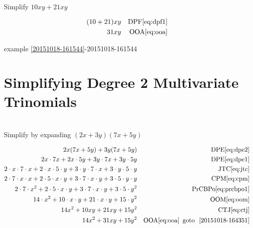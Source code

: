 \documentclass[20150903-160354-rs2.2-MarksMathNotebook.tex]{subfiles}
\begin{document}
\begin{example}[id:20151018-164351] \label{20151018-164351} \hfill \\

Simplify $10xy + 21xy$

\soln

\solnsteps
\begin{align*}
(10+21)xy && \text{DPF} \eqref{eq:dpf1} \\
31xy && \text{OOA} \eqref{eq:ooa} 
\end{align*}

\qdepend

\qdependlist
example \ref{20151018-161544}-20151018-161544

\end{example}



\section{Simplifying Degree 2 Multivariate Trinomials}\label{Simplify! Degree 2 Multivariate Trinomials}

\begin{example}[id:20151018-161544] \label{20151018-161544} \hfill \\
Simplify by expanding $(2x+3y)(7x+5y)$

\soln

\solnsteps
\begin{align*}
2x(7x+5y) + 3y(7x+5y) && \text{DPE} \eqref{eq:dpe2} \\
2x \cdot 7x + 2x \cdot 5y + 3y \cdot 7x + 3y \cdot 5y && \text{DPE} \eqref{eq:dpe1} \\
2 \cdot x \cdot 7 \cdot x +  2 \cdot x \cdot 5 \cdot y + 3 \cdot y \cdot 7 \cdot x + 3 \cdot y \cdot 5 \cdot y && \text{JTC} \eqref{eq:jtc} \\
2 \cdot 7 \cdot x \cdot x +  2 \cdot 5 \cdot x \cdot y + 3 \cdot 7 \cdot x \cdot y + 3 \cdot 5 \cdot y \cdot y && \text{CPM} \eqref{eq:cpm} \\
2 \cdot 7 \cdot x^2 +  2 \cdot 5 \cdot x \cdot y + 3 \cdot 7 \cdot x \cdot y + 3 \cdot 5 \cdot y^2 && \text{PrCBPo} \eqref{eq:prcbpo1} \\
14 \cdot x^2 +  10 \cdot x \cdot y + 21 \cdot x \cdot y + 15 \cdot y^2 && \text{OOM} \eqref{eq:oom} \\
14x^2 +  10xy + 21xy + 15y^2 && \text{CTJ} \eqref{eq:ctj} \\
14x^2 +  31xy + 15y^2 && \text{OOA} \eqref{eq:ooa} \text{\, goto \,} \, \ref{20151018-164351} 
\end{align*}
\end{example}
\end{document}
